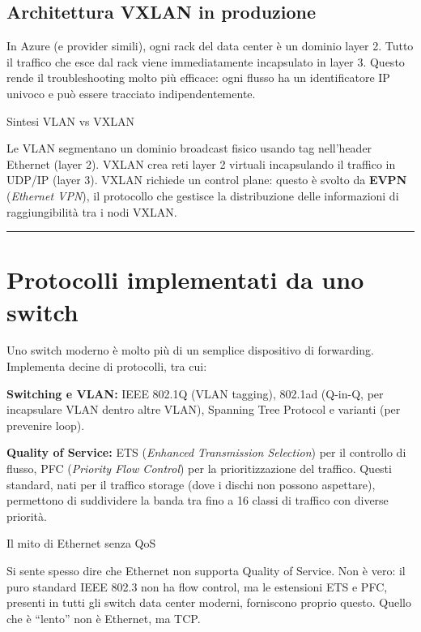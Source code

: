 \documentclass[
  italian,
  openany]{book}
\begin{document}
\subsection{Architettura VXLAN in
produzione}\label{architettura-vxlan-in-produzione}

In Azure (e provider simili), ogni rack del data center è un dominio
layer 2. Tutto il traffico che esce dal rack viene immediatamente
incapsulato in layer 3. Questo rende il troubleshooting molto più
efficace: ogni flusso ha un identificatore IP univoco e può essere
tracciato indipendentemente.

\begin{calloutnote}{Sintesi VLAN vs VXLAN}

Le VLAN segmentano un dominio broadcast fisico usando tag nell'header
Ethernet (layer 2). VXLAN crea reti layer 2 virtuali incapsulando il
traffico in UDP/IP (layer 3). VXLAN richiede un control plane: questo è
svolto da \textbf{EVPN} (\emph{Ethernet VPN}), il protocollo che
gestisce la distribuzione delle informazioni di raggiungibilità tra i
nodi VXLAN.

\end{calloutnote}

\begin{center}\rule{0.5\linewidth}{0.5pt}\end{center}

\section{Protocolli implementati da uno
switch}\label{protocolli-implementati-da-uno-switch}

Uno switch moderno è molto più di un semplice dispositivo di forwarding.
Implementa decine di protocolli, tra cui:

\textbf{Switching e VLAN:} IEEE 802.1Q (VLAN tagging), 802.1ad (Q-in-Q,
per incapsulare VLAN dentro altre VLAN), Spanning Tree Protocol e
varianti (per prevenire loop).

\textbf{Quality of Service:} ETS (\emph{Enhanced Transmission
Selection}) per il controllo di flusso, PFC (\emph{Priority Flow
Control}) per la prioritizzazione del traffico. Questi standard, nati
per il traffico storage (dove i dischi non possono aspettare),
permettono di suddividere la banda tra fino a 16 classi di traffico con
diverse priorità.

\begin{calloutnote}{Il mito di Ethernet senza QoS}

Si sente spesso dire che Ethernet non supporta Quality of Service. Non è
vero: il puro standard IEEE 802.3 non ha flow control, ma le estensioni
ETS e PFC, presenti in tutti gli switch data center moderni, forniscono
proprio questo. Quello che è ``lento'' non è Ethernet, ma TCP.

\end{calloutnote}
\end{document}
